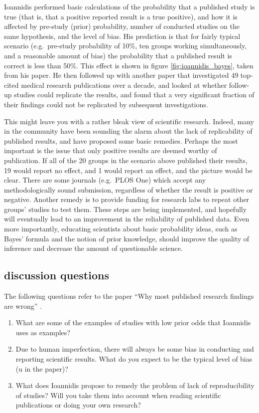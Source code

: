 \documentclass[
  letterpaper,
  DIV=11,
  numbers=noendperiod]{scrreprt}
\begin{document}
Ioannidis performed basic calculations of the probability that a
published study is true (that is, that a positive reported result is a
true positive), and how it is affected by pre-study (prior) probability,
number of conducted studies on the same hypothesis, and the level of
bias. His prediction is that for fairly typical scenario (e.g.~pre-study
probability of 10\%, ten groups working simultaneously, and a reasonable
amount of bias) the probability that a published result is correct is
less than 50\%. This effect is shown in figure
\ref{fig:ioannidis_bayes}, taken from his paper. He then followed up
with another paper \cite{ioannidis_ja_contradicted_2005} that
investigated 49 top-cited medical research publications over a decade,
and looked at whether follow-up studies could replicate the results, and
found that a very significant fraction of their findings could not be
replicated by subsequent investigations.

This might leave you with a rather bleak view of scientific research.
Indeed, many in the community have been sounding the alarm about the
lack of replicability of published results, and have proposed some basic
remedies. Perhaps the most important is the issue that only positive
results are deemed worthy of publication. If all of the 20 groups in the
scenario above published their results, 19 would report no effect, and 1
would report an effect, and the picture would be clear. There are some
journals (e.g.~PLOS One) which accept any methodologically sound
submission, regardless of whether the result is positive or negative.
Another remedy is to provide funding for research labs to repeat other
groups' studies to test them. These steps are being implemented, and
hopefully will eventually lead to an improvement in the reliability of
published data. Even more importantly, educating scientists about basic
probability ideas, such as Bayes' formula and the notion of prior
knowledge, should improve the quality of inference and decrease the
amount of questionable science.

\hypertarget{discussion-questions-2}{%
\subsection{discussion questions}\label{discussion-questions-2}}

The following questions refer to the paper ``Why most published research
findings are wrong'' \cite{ioannidis_why_2005}.

\begin{enumerate}
\def\labelenumi{\arabic{enumi}.}
\item
  What are some of the examples of studies with low prior odds that
  Ioannidis uses as examples?
\item
  Due to human imperfection, there will always be some bias in
  conducting and reporting scientific results. What do you expect to be
  the typical level of bias (u in the paper)?
\item
  What does Ioannidis propose to remedy the problem of lack of
  reproducibility of studies? Will you take them into account when
  reading scientific publications or doing your own research?
\end{enumerate}
\end{document}

